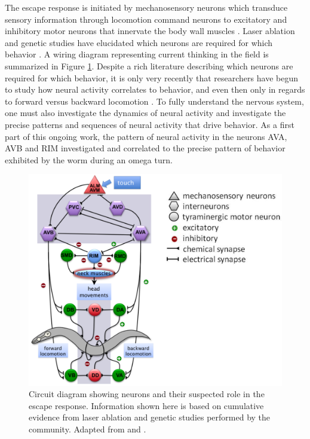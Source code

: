  The escape response is initiated by mechanosensory neurons which transduce sensory information through locomotion command neurons to excitatory and inhibitory motor neurons that innervate the body wall muscles \citep{chalfie_neural_1985}. Laser ablation and genetic studies have  elucidated which neurons are required for which behavior \citep{chalfie_neural_1985, zheng_neuronal_1999, alkema_tyramine_2005}. A wiring diagram representing current thinking in the field is summarized in Figure \ref{fig:omegaCircuitDiagram}. Despite a rich literature describing which neurons are required for which behavior, it is only very recently that researchers have begun to study how neural activity correlates to behavior, and even then only in regards to forward versus backward locomotion \citep{piggott_neural_2011, faumont_image-free_2011, kawano_imbalancing_2011, ben_arous_automated_2010}. To fully understand the nervous system, one must also investigate the dynamics of neural activity and investigate the precise patterns and sequences of neural activity that drive behavior. As a first part of this ongoing work, the pattern of neural activity in the neurons AVA, AVB and RIM investigated and correlated to the precise pattern of behavior exhibited by the worm during an omega turn. 

\begin{figure}  %
\includegraphics[width=\textwidth]{figures/omegaCircuitDiagram}
\caption[Circuit diagram representing current thinking in the field]{Circuit diagram showing neurons and their suspected role in the escape response. Information shown here is based on cumulative evidence from laser ablation and genetic studies performed by the community. Adapted from \citep{alkema_tyramine_2005} and \citep{pirri_tyramine-gated_2009}. 
\label{fig:omegaCircuitDiagram}}
\end{figure}

